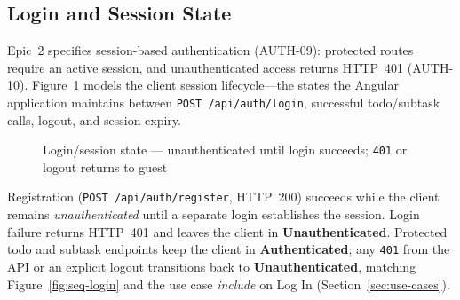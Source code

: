 \subsection{Login and Session State}\label{sec:session-state}
Epic~2 specifies session-based authentication (AUTH-09): protected routes require an active session,
and unauthenticated access returns HTTP~401 (AUTH-10). Figure~\ref{fig:state-session} models the
client session lifecycle---the states the Angular application maintains between
\texttt{POST /api/auth/login}, successful todo/subtask calls, logout, and session expiry.

\begin{figure}[htbp]
  \centering
  \caption{Login/session state --- unauthenticated until login succeeds; \texttt{401} or logout returns to guest}
  \label{fig:state-session}
\end{figure}

Registration (\texttt{POST /api/auth/register}, HTTP~200) succeeds while the client remains
\emph{unauthenticated} until a separate login establishes the session. Login failure returns
HTTP~401 and leaves the client in \textbf{Unauthenticated}. Protected todo and subtask endpoints
keep the client in \textbf{Authenticated}; any \texttt{401} from the API or an explicit logout
transitions back to \textbf{Unauthenticated}, matching Figure~\ref{fig:seq-login} and the use case
\emph{include} on Log In (Section~\ref{sec:use-cases}).

\newpage
